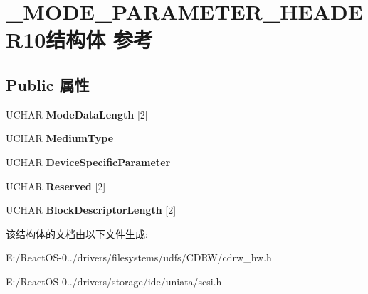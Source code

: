 \hypertarget{struct___m_o_d_e___p_a_r_a_m_e_t_e_r___h_e_a_d_e_r10}{}\section{\+\_\+\+M\+O\+D\+E\+\_\+\+P\+A\+R\+A\+M\+E\+T\+E\+R\+\_\+\+H\+E\+A\+D\+E\+R10结构体 参考}
\label{struct___m_o_d_e___p_a_r_a_m_e_t_e_r___h_e_a_d_e_r10}
\subsection*{Public 属性}
\begin{DoxyCompactItemize}
\item 
\mbox{\label{struct___m_o_d_e___p_a_r_a_m_e_t_e_r___h_e_a_d_e_r10_ac454f0918741ce4b11fa86283a08cc64}} 
U\+C\+H\+AR {\bfseries Mode\+Data\+Length} \mbox{[}2\mbox{]}
\item 
\mbox{\label{struct___m_o_d_e___p_a_r_a_m_e_t_e_r___h_e_a_d_e_r10_a4f63a14b87b39190e06a74eaf280d424}} 
U\+C\+H\+AR {\bfseries Medium\+Type}
\item 
\mbox{\label{struct___m_o_d_e___p_a_r_a_m_e_t_e_r___h_e_a_d_e_r10_a9e8ebf45b5afd2b64924fdacbfb57683}} 
U\+C\+H\+AR {\bfseries Device\+Specific\+Parameter}
\item 
\mbox{\label{struct___m_o_d_e___p_a_r_a_m_e_t_e_r___h_e_a_d_e_r10_a16568f34fa837c03f359c1f9a3d0942c}} 
U\+C\+H\+AR {\bfseries Reserved} \mbox{[}2\mbox{]}
\item 
\mbox{\label{struct___m_o_d_e___p_a_r_a_m_e_t_e_r___h_e_a_d_e_r10_a750a4c00f5ad9ddcd0254788981a8d5f}} 
U\+C\+H\+AR {\bfseries Block\+Descriptor\+Length} \mbox{[}2\mbox{]}
\end{DoxyCompactItemize}


该结构体的文档由以下文件生成\+:\begin{DoxyCompactItemize}
\item 
E\+:/\+React\+O\+S-\/0../drivers/filesystems/udfs/\+C\+D\+R\+W/cdrw\+\_\+hw.\+h\item 
E\+:/\+React\+O\+S-\/0../drivers/storage/ide/uniata/scsi.\+h\end{DoxyCompactItemize}
